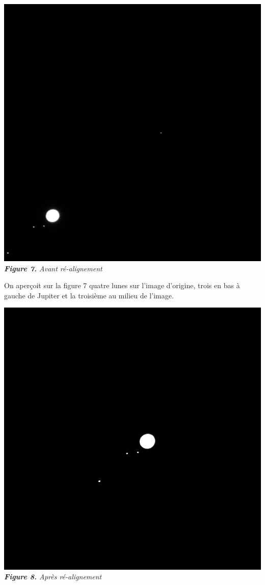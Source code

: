 \documentclass{aa}
\begin{document}
\begin{center}
    \includegraphics[scale = 0.2]{images/avant_realignement.png} \\
    \emph{\textbf{Figure 7.} Avant ré-alignement}
\end{center}

On aperçoit sur la figure 7 quatre lunes sur l'image d'origine, trois en bas à gauche de Jupiter et la troisième au milieu de l'image. \\

\begin{center}
    \includegraphics[scale = 0.5]{images/apres_realignement_06.png} \\
    \emph{\textbf{Figure 8.} Après ré-alignement}
\end{center}
\end{document}
